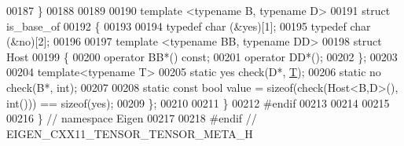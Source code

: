 \begin{DoxyCode}
00187   \}
00188 
00189 
00190   \textcolor{keyword}{template} <\textcolor{keyword}{typename} B, \textcolor{keyword}{typename} D>
00191   \textcolor{keyword}{struct }is\_base\_of
00192   \{
00193 
00194     \textcolor{keyword}{typedef} char (&yes)[1];
00195     \textcolor{keyword}{typedef} char (&no)[2];
00196 
00197     \textcolor{keyword}{template} <\textcolor{keyword}{typename} BB, \textcolor{keyword}{typename} DD>
00198     \textcolor{keyword}{struct }Host
00199     \{
00200       \textcolor{keyword}{operator} BB*() \textcolor{keyword}{const};
00201       \textcolor{keyword}{operator} DD*();
00202     \};
00203 
00204     \textcolor{keyword}{template}<\textcolor{keyword}{typename} T>
00205     \textcolor{keyword}{static} yes check(D*, \hyperlink{group___sparse_core___module_class_eigen_1_1_triplet}{T});
00206     \textcolor{keyword}{static} no check(B*, \textcolor{keywordtype}{int});
00207 
00208     \textcolor{keyword}{static} \textcolor{keyword}{const} \textcolor{keywordtype}{bool} value = \textcolor{keyword}{sizeof}(check(Host<B,D>(), \textcolor{keywordtype}{int}())) == \textcolor{keyword}{sizeof}(yes);
00209   \};
00210 
00211 \}
00212 \textcolor{preprocessor}{#endif}
00213 
00214 
00215 
00216 \}  \textcolor{comment}{// namespace Eigen}
00217 
00218 \textcolor{preprocessor}{#endif  // EIGEN\_CXX11\_TENSOR\_TENSOR\_META\_H}
\end{DoxyCode}
